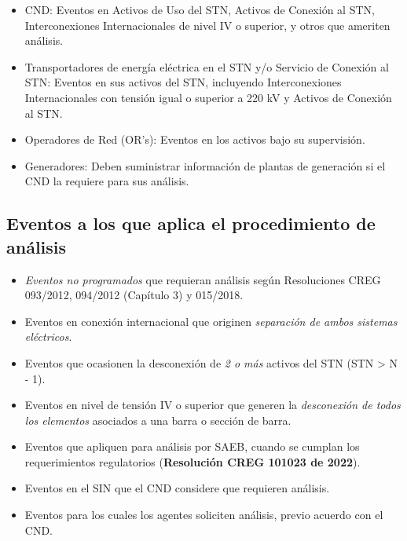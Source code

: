 \documentclass[a5paper]{book}%
\begin{document}
\begin{itemize}
  
\item CND: Eventos en Activos de Uso del STN, Activos de Conexión al STN, Interconexiones Internacionales de nivel IV o superior, y otros que ameriten análisis.
    
  \item Transportadores de energía eléctrica en el \ac{STN} y/o Servicio de Conexión al \ac{STN}: Eventos en sus activos del \ac{STN}, incluyendo Interconexiones Internacionales con tensión igual o superior a 220 kV y Activos de Conexión al \ac{STN}.
  
  \item Operadores de Red (OR's): Eventos en los activos bajo su supervisión.
    
  \item Generadores: Deben suministrar información de plantas de generación si el \ac{CND} la requiere para sus análisis.

\end{itemize}



\subsection{Eventos a los que aplica el procedimiento de análisis}

\begin{itemize}
\item\textit{ Eventos no programados} que requieran análisis según Resoluciones CREG 093/2012, 094/2012 (Capítulo 3) y 015/2018.
\item Eventos en conexión internacional que originen \textit{separación de ambos sistemas eléctricos}.
    
\item Eventos que ocasionen la desconexión de \textit{2 o más} activos del STN (STN > N - 1).
    
\item Eventos en nivel de tensión IV o superior que generen la \textit{desconexión de todos los elementos} asociados a una barra o sección de barra.
    
\item Eventos que apliquen para análisis por \ac{SAEB}, cuando se cumplan los requerimientos regulatorios (\textbf{Resolución CREG 101023 de 2022}).
    
\item Eventos en el SIN que el CND considere que requieren análisis.
    
\item Eventos para los cuales los agentes soliciten análisis, previo acuerdo con el CND.

\end{itemize}
    
\end{document}
